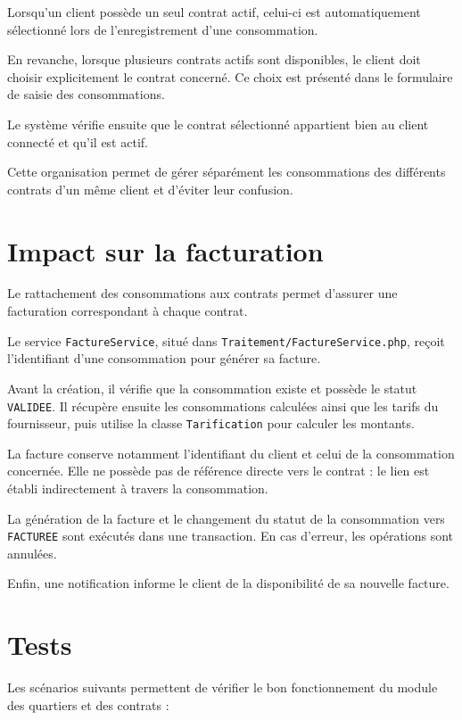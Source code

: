 Lorsqu'un client possède un seul contrat actif, celui-ci est automatiquement sélectionné lors de l'enregistrement d'une consommation.

En revanche, lorsque plusieurs contrats actifs sont disponibles, le client doit choisir explicitement le contrat concerné. Ce choix est présenté dans le formulaire de saisie des consommations.

Le système vérifie ensuite que le contrat sélectionné appartient bien au client connecté et qu'il est actif.

Cette organisation permet de gérer séparément les consommations des différents contrats d'un même client et d'éviter leur confusion.

\section{Impact sur la facturation}

Le rattachement des consommations aux contrats permet d'assurer une facturation correspondant à chaque contrat.

Le service \texttt{FactureService}, situé dans \texttt{Traitement/FactureService.php}, reçoit l'identifiant d'une consommation pour générer sa facture.

Avant la création, il vérifie que la consommation existe et possède le statut \texttt{VALIDEE}. Il récupère ensuite les consommations calculées ainsi que les tarifs du fournisseur, puis utilise la classe \texttt{Tarification} pour calculer les montants.

La facture conserve notamment l'identifiant du client et celui de la consommation concernée. Elle ne possède pas de référence directe vers le contrat : le lien est établi indirectement à travers la consommation.

La génération de la facture et le changement du statut de la consommation vers \texttt{FACTUREE} sont exécutés dans une transaction. En cas d'erreur, les opérations sont annulées.

Enfin, une notification informe le client de la disponibilité de sa nouvelle facture.

\section{Tests}

Les scénarios suivants permettent de vérifier le bon fonctionnement du module des quartiers et des contrats :

